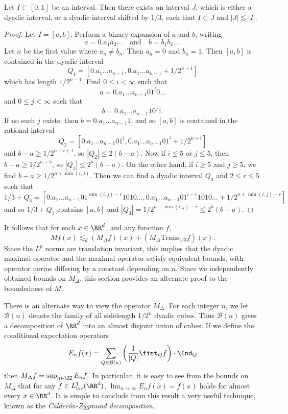 \begin{lemma}
  Let $I \subset [0,1]$ be an interval. Then there exists an interval $J$, which is either a dyadic interval, or a dyadic interval shifted by $1/3$, such that $I \subset J$ and $|J| \lesssim |I|$.
\end{lemma}
\begin{proof}
  Let $I = [a,b]$. Perform a binary expansion of $a$ and $b$, writing
  \[ a = 0.a_1a_2 \dots \quad\text{and}\quad b = b_1 b_2 \dots. \]
  Let $n$ be the first value where $a_n \neq b_n$. Then $a_n = 0$ and $b_n = 1$. Then $[a,b]$ is contained in the dyadic interval
  \[ Q_1 = \left[ 0.a_1 \dots a_{n-1}, 0.a_1\dots a_{n-1} + 1/2^{n-1} \right] \]
  which has length $1/2^{n-1}$. Find $0 \leq i < \infty$ such that
  \[ a = 0.a_1 \dots a_{n-1} 0 1^i 0 \dots \]
  and $0 \leq j < \infty$ such that
  \[ b = 0.a_1 \dots a_{n-1} 1 0^j 1. \]
  If no such $j$ exists, then $b = 0.a_1 \dots a_{n-1} 1$, and so $[a,b]$ is contained in the rational interval
  \[ Q_2 = \left[ 0.a_1 \dots a_{n-1} 0 1^i, 0.a_1 \dots a_{n-1} 0 1^i + 1/2^{n+i} \right] \]
  and $b - a \geq 1/2^{n+i+1}$, so $|Q_2| \leq 2(b - a)$. Now if $i \leq 5$ or $j \leq 5$, then $b - a \geq 1/2^{n+5}$, so $|Q_1| \leq 2^5(b-a)$. On the other hand, if $i \geq 5$ and $j \geq 5$, we find $b - a \geq 1/2^{n+\min(i,j)}$. Then we can find a dyadic interval $Q_3$ and $2 \leq r \leq 5$ such that
  \[ 1/3 + Q_3 = \left[ 0.a_1 \dots a_{n-1} 0 1^{\min(i,j)-r} 1 0 1 0 \dots, 0.a_1 \dots a_{n-1} 0 1^{i-r} 1 0 1 0 \dots + 1/2^{n+\min(i,j)-r}  \right] \]
  and so $1/3 + Q_3$ contains $[a,b]$ and $|Q_3| = 1/2^{n+\min(i,j)-r} \leq 2^5 (b - a)$.
\end{proof}

It follows that for each $x \in \RR^d$, and any function $f$,
%
\[ Mf(x) \lesssim_d (M_\Delta f)(x) + (M_\Delta \text{Trans}_{1/3} f)(x). \]
%
Since the $L^p$ norms are translation invariant, this implies that the dyadic maximal operator and the maximal operator satisfy equivalent bounds, with operator norms differing by a constant depending on $n$. Since we independently obtained bounds on $M_\Delta$, this section provides an alternate proof to the boundedness of $M$.

There is an alternate way to view the operator $M_\Delta$. For each integer $n$, we let $\mathcal{B}(n)$ denote the family of all sidelength $1/2^n$ dyadic cubes. Thus $\mathcal{B}(n)$ gives a decomposition of $\RR^d$ into an almost disjoint union of cubes. If we define the conditional expectation operators
%
\[ E_n f(x) = \sum_{Q \in \mathcal{B}(n)} \left( \frac{1}{|Q|} \fint_Q f \right) \cdot \Ind_Q \]
%
then $M_\Delta f = \sup_{n \in \ZZ} E_n f$. In particular, it is easy to see from the bounds on $M_\Delta$ that for any $f \in L^1_{\text{loc}}(\RR^d)$, $\lim_{n \to \infty} E_n f(x) = f(x)$ holds for almost every $x \in \RR^d$. It is simple to conclude from this result a very useful technique, known as the \emph{Calder\'{o}n-Zygmund decomposition}.

